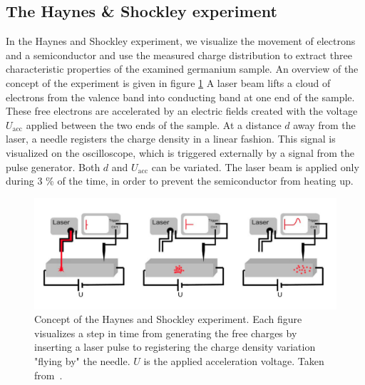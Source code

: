 \subsection{The Haynes \& Shockley experiment}
In the Haynes and Shockley experiment, we visualize the movement 
of electrons and a semiconductor and use the measured 
charge distribution to extract three characteristic 
properties of the examined germanium sample.
An overview of the concept of the experiment is given 
in figure \ref{fig:H_S_overview}
A laser beam lifts a cloud of electrons from the valence band into 
conducting band at one end of the sample. 
These free electrons are accelerated 
by an electric fields created with the voltage $U_\mathrm{acc}$ 
applied between the two ends of the sample. 
At a distance $d$ away from the laser, a needle 
registers the charge density in a linear fashion.
This signal is visualized on the oscilloscope, which
is triggered externally by a signal from the pulse 
generator. 
Both $d$ and $U_\mathrm{acc}$ can be variated. 
The laser beam is applied only during 3 \% of the time, in 
order to prevent the semiconductor from heating up. 

\begin{figure}
    \includegraphics[width=\textwidth]{figures/H_S_overview}
    \caption{
        Concept of the Haynes and Shockley experiment. 
        Each figure visualizes a step in time from 
        generating the free charges by inserting a laser pulse 
        to registering the charge density variation "flying by" 
        the needle. $U$ is the applied acceleration voltage. 
        Taken from~\cite{ver}.
        }
    \label{fig:H_S_overview}
\end{figure}

